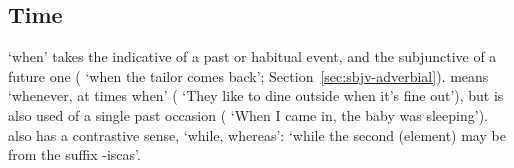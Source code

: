 \subsection{Time}
 `when' takes the indicative of a past or habitual event, and the subjunctive of a future one ( `when the tailor comes back'; Section~\ref{sec:sbjv-adverbial}).  means `whenever, at times when' ( `They like to dine outside when it's fine out'), but is also used of a single past occasion ( `When I came in, the baby was sleeping').
 also has a contrastive sense, `while, whereas':  `while the second (element) may be from the suffix -iscas'.

